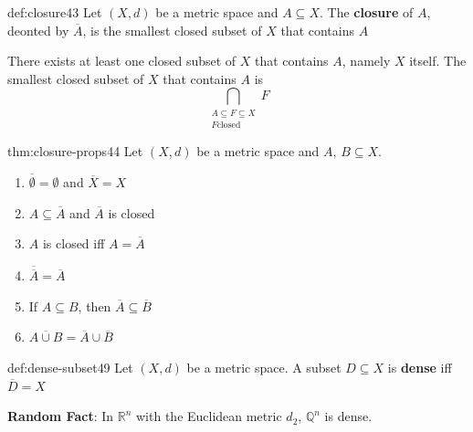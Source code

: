 \documentclass[landscape, 8pt]{extarticle}
\begin{document}
\begin{multicols}{3}
\begin{dfn}[Closure]{def:closure}{43}
    \vspace{-5pt}
    Let $(X, d)$ be a metric space and $A \subseteq X$. The \textbf{closure} of $A$, deonted by $\overline{A}$, is the smallest closed subset of $X$ that contains $A$

    There exists at least one closed subset of $X$ that contains $A$, namely $X$ itself. The smallest closed subset of $X$ that contains $A$ is
    \[\bigcap\limits_{\substack{A \subseteq F \subseteq X\\
    F \text{closed}}} F\]
\end{dfn}

\begin{thm}{thm:closure-props}{44}
    \vspace{-5pt}
    Let $(X, d)$ be a metric space and $A,\,B \subseteq X$.
    \vspace{-15pt}
    \begin{multicols}{2}
        \begin{enumerate}[leftmargin=*]
            \item $\overline{\emptyset} = \emptyset$ and $\overline{X} = X$
            \item $A \subseteq \overline{A}$ and $\overline{A}$ is closed
            \item $A$ is closed iff $A = \overline{A}$
            \item $\overline{\overline{A}} = \overline{A}$
            \item If $A \subseteq B$, then $\overline{A} \subseteq \overline{B}$
            \item $\overline{A \cup B} = \overline{A} \cup \overline{B}$
        \end{enumerate}
    \end{multicols}
\end{thm}


\begin{dfn}{def:dense-subset}{49}
    Let $(X, d)$ be a metric space. A subset $D \subseteq X$ is \textbf{dense} iff $\overline{D} = X$

    \longrule{0.08ex}
    \textbf{Random Fact}: In $\mathbb{R}^{n}$ with the Euclidean metric $d_{2}$, $\mathbb{Q}^{n}$ is dense.
\end{dfn}


\end{multicols}
\end{document}
